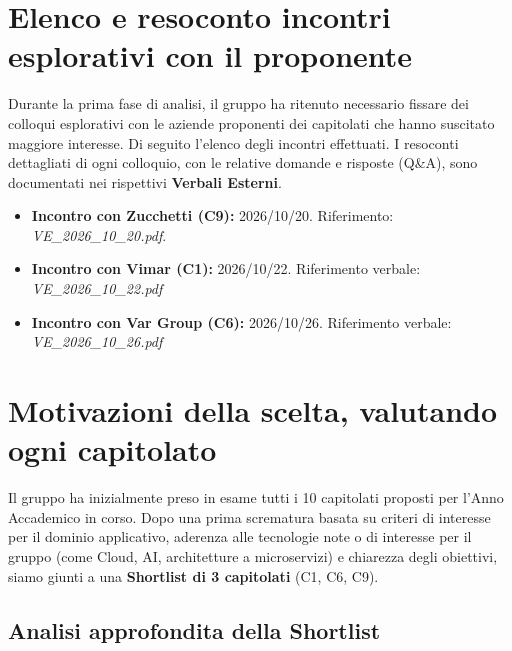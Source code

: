 \documentclass[a4paper, 11pt]{article}
\begin{document}
\newpage
\tableofcontents
\newpage

\section{Elenco e resoconto incontri esplorativi con il proponente}

Durante la prima fase di analisi, il gruppo ha ritenuto necessario fissare dei colloqui esplorativi con le aziende proponenti dei capitolati che hanno suscitato maggiore interesse. Di seguito l'elenco degli incontri effettuati. I resoconti dettagliati di ogni colloquio, con le relative domande e risposte (Q\&A), sono documentati nei rispettivi \textbf{Verbali Esterni}.

\begin{itemize}
    \item \textbf{Incontro con Zucchetti (C9):} 2026/10/20. Riferimento: \textit{VE\_2026\_10\_20.pdf}.
    \item \textbf{Incontro con Vimar (C1):} 2026/10/22. Riferimento verbale: \textit{VE\_2026\_10\_22.pdf}
    \item \textbf{Incontro con Var Group (C6):} 2026/10/26. Riferimento verbale: \textit{VE\_2026\_10\_26.pdf}
\end{itemize}

\section{Motivazioni della scelta, valutando ogni capitolato}

Il gruppo ha inizialmente preso in esame tutti i 10 capitolati proposti per l'Anno Accademico in corso. Dopo una prima scrematura basata su criteri di interesse per il dominio applicativo, aderenza alle tecnologie note o di interesse per il gruppo (come Cloud, AI, architetture a microservizi) e chiarezza degli obiettivi, siamo giunti a una \textbf{Shortlist di 3 capitolati} (C1, C6, C9).

\subsection{Analisi approfondita della Shortlist}
\end{document}
